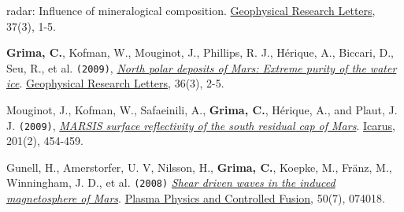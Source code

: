 \begin{etaremune}
{{  radar: Influence of mineralogical composition}}. \ul{Geophysical Research
  Letters}, 37(3), 1-5.
\item
  \textbf{Grima, C.}, Kofman, W., Mouginot, J., Phillips, R. J.,
  Hérique, A., Biccari, D., Seu, R., et al. \texttt{(2009)},
  \href{http://onlinelibrary.wiley.com/doi/10.1029/2008GL036326/abstract}{\emph{North
  polar deposits of Mars: Extreme purity of the water ice}}. \ul{Geophysical
  Research Letters}, 36(3), 2-5.
\item
  Mouginot, J., Kofman, W., Safaeinili, A., \textbf{Grima, C.}, Hérique,
  A., and Plaut, J. J. \texttt{(2009)},
  \href{http://www.sciencedirect.com/science/article/pii/S0019103509000311}{
  \emph{MARSIS surface reflectivity of the south residual cap of Mars}}.
  \ul{Icarus}, 201(2), 454-459.
\item
  Gunell, H., Amerstorfer, U. V, Nilsson, H., \textbf{Grima, C.},
  Koepke, M., Fränz, M., Winningham, J. D., et al. \texttt{(2008)}
  \href{http://iopscience.iop.org/0741-3335/50/7/074018}{\emph{Shear
  driven waves in the induced magnetosphere of Mars}}. \ul{Plasma Physics
  and Controlled Fusion}, 50(7), 074018.
\end{etaremune}
